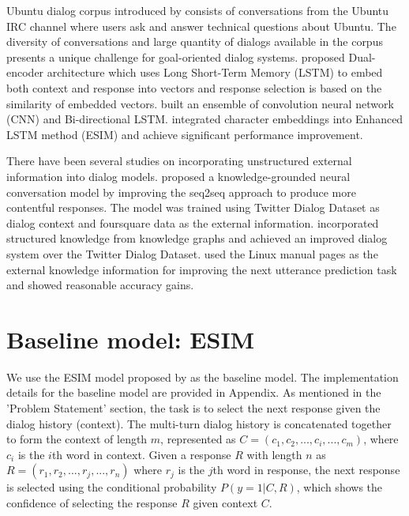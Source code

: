 \documentclass[letterpaper]{article} %
\begin{document}
Ubuntu dialog corpus introduced by \citeauthor{lowe2015ubuntu}  consists of conversations from the Ubuntu IRC channel where users ask and answer technical questions about Ubuntu. The diversity of conversations and large quantity of dialogs available in the corpus presents a unique challenge for goal-oriented dialog systems. \citeauthor{lowe2015ubuntu}  proposed Dual-encoder architecture which uses Long Short-Term Memory (LSTM) \cite{hochreiter1997long} to embed both context and response into vectors and response selection is based on the similarity of embedded vectors. \citeauthor{kadlec2015improved}  built an ensemble of convolution neural network (CNN) \citeauthor{krizhevsky2012imagenet}  and Bi-directional LSTM.
\citeauthor{dong2018enhance}  integrated character embeddings \cite{dos2015boosting} into Enhanced LSTM method (ESIM) \cite{chen2017enhanced} and achieve significant performance improvement.

There have been several studies on incorporating unstructured external information into dialog models. \citeauthor{ghazvininejad2017knowledge}  proposed a knowledge-grounded neural conversation model by improving the seq2seq approach to produce more contentful responses. The model was trained using Twitter Dialog Dataset \cite{li2016diversity} as dialog context and foursquare data as the external information. \citeauthor{young2017augmenting}  incorporated structured knowledge from knowledge graphs and achieved an improved dialog system over the Twitter Dialog Dataset.  \citeauthor{lowe2015incorporating}  used the Linux manual pages as the external knowledge information for improving the next utterance prediction task and showed reasonable accuracy gains.


\section{Baseline model: ESIM}
\label{baseline-model-esim}

We use the ESIM model proposed by \citeauthor{chen2017enhanced}  as the baseline model. The implementation details for the baseline model are provided in Appendix. As mentioned in the 'Problem Statement' section, the task is to select the next response given the dialog history (context). The multi-turn dialog history is concatenated together to form the context of length $m$, represented as $C = (c_1, c_2, ..., c_i, ..., c_m)$, where $c_i$ is the $i$th word in context. Given a response $R$ with length $n$ as $R = (r_1, r_2, ..., r_j, ..., r_n)$ where $r_j$ is the $j$th word in response, the next response is
selected using the conditional probability $P(y=1|C,R)$, which shows the confidence of selecting the response $R$ given context $C$.
\end{document}
